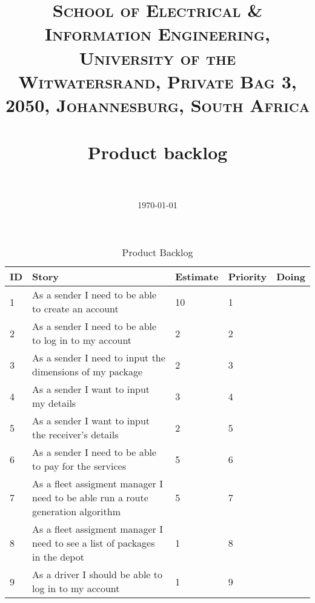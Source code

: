 \documentclass[paper=a4, fontsize=11pt]{scrartcl} %
\title{	
\normalfont \normalsize 
\textsc{School of Electrical \& Information Engineering, University of the
Witwatersrand, Private Bag 3, 2050, Johannesburg, South Africa} \\ [25pt] %
\horrule{0.5pt} \\[0.4cm] %
\huge Product backlog \\ %
\horrule{2pt} \\[0.5cm] %
}
\author{} %
\date{\normalsize\today} %
\numberwithin{equation}{section} %
\numberwithin{figure}{section} %
\numberwithin{table}{section} %
\begin{document}
\maketitle %



\begin{table}[]
\centering
\caption{Product Backlog}
\label{my-label}
\begin{tabular}{|p{1cm}|p{8cm}|p{2cm}|p{1.2cm}|p{1.5cm}|}
\hline
\textbf{ID} & \textbf{Story}                                                                                         & \textbf{Estimate} & \textbf{Priority} & \textbf{Doing} \\ \hline
1           & As a sender I need to be able to create an account                                                     & 10                & 1                 &                \\ \hline
2           & As a sender I need to be able to log in to my account                                                  & 2                 & 2                 &                \\ \hline
3           & As a sender I need to input the dimensions of my package                                               & 2                 & 3                 &                \\ \hline
4           & As a sender I want to input my details                                                                 & 3                 & 4                 &                \\ \hline
5           & As a sender I want to input the receiver's details                                                     & 2                 & 5                 &                \\ \hline
6           & As a sender I need to be able to pay for the services                                                  & 5                 & 6                 &                \\ \hline
7           & As a fleet assigment manager I need to be able run a route generation algorithm                        & 5                 & 7                 &                \\ \hline
8           & As a fleet assigment manager I need to see a list of packages in the depot                             & 1                 & 8                 &                \\ \hline
9           & As a driver I should be able to log in to my account                                                   & 1                 & 9                 &                \\ \hline

\end{tabular}
\end{table}
\end{document}
